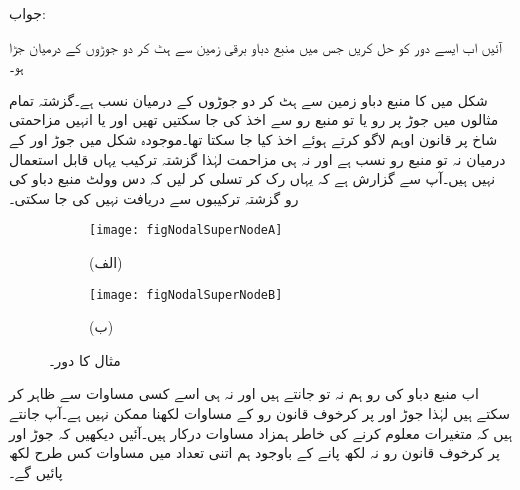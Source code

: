 جواب:


آئیں اب ایسے دور کو حل کریں جس میں منبع دباو برقی زمین سے ہٹ کر دو جوڑوں کے درمیان جڑا ہو۔

شکل  میں  کا منبع دباو زمین سے ہٹ کر دو جوڑوں کے درمیان نسب ہے۔گزشتہ تمام مثالوں میں جوڑ پر رو یا تو منبع رو سے اخذ کی جا سکتیں تھیں اور یا انہیں مزاحمتی شاخ پر قانون اوہم لاگو کرتے ہوئے اخذ کیا جا سکتا تھا۔موجودہ شکل میں جوڑ  اور  کے درمیان نہ تو منبع رو نسب ہے اور نہ ہی مزاحمت لہٰذا گزشتہ ترکیب یہاں قابل استعمال نہیں ہیں۔آپ سے گزارش ہے کہ یہاں رک کر تسلی کر لیں کہ دس وولٹ منبع دباو کی رو گزشتہ ترکیبوں سے دریافت نہیں کی جا سکتی۔ 
\begin{figure}
\centering
\begin{subfigure}{1\textwidth}
\centering
\texttt{[image: figNodalSuperNodeA]}
\caption*{(الف)}
\end{subfigure}
\begin{subfigure}{1\textwidth}
\centering
\texttt{[image: figNodalSuperNodeB]}
\caption*{(ب)}
\end{subfigure}
\caption{مثال  کا دور۔}
\label{شکل_مثال_جوڑ_غیر_تابع_منبع_دباو_دو_جوڑ_مابین}
\end{figure}%

اب منبع دباو کی رو ہم نہ تو جانتے ہیں اور نہ ہی اسے کسی مساوات سے ظاہر کر سکتے ہیں لہٰذا جوڑ  اور  پر کرخوف قانون رو کے مساوات لکھنا ممکن نہیں ہے۔آپ جانتے ہیں کہ  متغیرات معلوم کرنے کی خاطر  ہمزاد مساوات درکار ہیں۔آئیں دیکھیں کہ  جوڑ  اور  پر کرخوف قانون رو نہ لکھ پانے کے باوجود ہم اتنی تعداد میں مساوات کس طرح  لکھ پائیں گے۔

